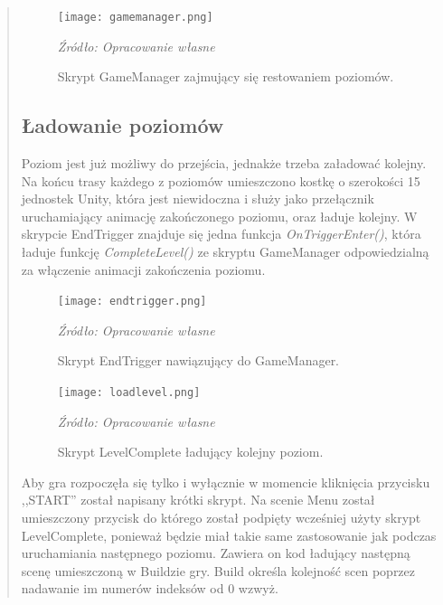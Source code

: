 \begin{quotation}
\begin{figure}[!hbt]
\centering
  \texttt{[image: gamemanager.png]}
  \caption{Skrypt GameManager zajmujący się restowaniem poziomów.}\label{rys_26}
  \begin{minipage}[t]{0.75\linewidth}
    \emph{Źródło: Opracowanie własne}
  \end{minipage}
\end{figure}

\newpage
\subsection{Ładowanie poziomów}
\indent Poziom jest już możliwy do przejścia, jednakże trzeba załadować kolejny. Na końcu trasy każdego z poziomów umieszczono kostkę o szerokości 15 jednostek Unity, która jest niewidoczna i służy jako przełącznik uruchamiający animację zakończonego poziomu, oraz ładuje kolejny. W skrypcie EndTrigger znajduje się jedna funkcja \textit{OnTriggerEnter()}, która ładuje funkcję \textit{CompleteLevel()} ze skryptu GameManager odpowiedzialną za włączenie animacji zakończenia poziomu.

\begin{figure}[!ht]
\centering
  \texttt{[image: endtrigger.png]}
  \caption{Skrypt EndTrigger nawiązujący do GameManager.}\label{rys_27}
  \begin{minipage}[t]{0.75\linewidth}
    \emph{Źródło: Opracowanie własne}
  \end{minipage}
\end{figure}

\begin{figure}[!h]
\centering
  \texttt{[image: loadlevel.png]}
  \caption{Skrypt LevelComplete ładujący kolejny poziom.}\label{rys_28}
  \begin{minipage}[t]{0.75\linewidth}
    \emph{Źródło: Opracowanie własne}
  \end{minipage}
\end{figure}

\indent Aby gra rozpoczęła się tylko i wyłącznie w momencie kliknięcia przycisku ,,START'' został napisany krótki skrypt. Na scenie Menu został umieszczony przycisk do którego został podpięty wcześniej użyty skrypt LevelComplete, ponieważ będzie miał takie same zastosowanie jak podczas uruchamiania następnego poziomu. Zawiera on kod ładujący następną scenę umieszczoną w Buildzie gry. Build określa kolejność scen poprzez nadawanie im numerów indeksów od 0 wzwyż. 


\end{quotation}
